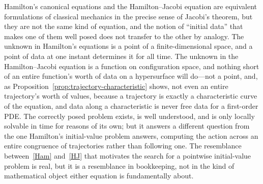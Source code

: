 Hamilton's canonical equations and the Hamilton--Jacobi equation are equivalent
formulations of classical mechanics in the precise sense of Jacobi's theorem,
but they are not the same kind of equation, and the notion of ``initial data''
that makes one of them well posed does not transfer to the other by analogy.
The unknown in Hamilton's equations is a point of a finite-dimensional space,
and a point of data at one instant determines it for all time. The unknown in
the Hamilton--Jacobi equation is a function on configuration space, and nothing
short of an entire function's worth of data on a hypersurface will do---not a
point, and, as Proposition~\ref{prop:trajectory-characteristic} shows, not even
an entire trajectory's worth of values, because a trajectory is exactly a
characteristic curve of the equation, and data along a characteristic is never
free data for a first-order PDE. The correctly posed problem exists, is well
understood, and is only locally solvable in time for reasons of its own; but it
answers a different question from the one Hamilton's initial-value problem
answers, computing the action across an entire congruence of trajectories
rather than following one. The resemblance between~\eqref{Ham} and~\eqref{HJ}
that motivates the search for a pointwise initial-value problem is real, but it
is a resemblance in bookkeeping, not in the kind of mathematical object either
equation is fundamentally about.
